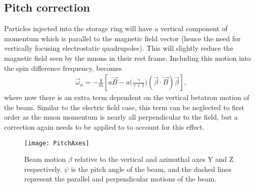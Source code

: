 


\subsection{Pitch correction}
\label{sub:pitch_correction}

Particles injected into the \gmtwo storage ring will have a vertical component of momentum which is parallel to the magnetic field vector (hence the need for vertically focusing electrostatic quadrupoles). This will slightly reduce the magnetic field seen by the muons in their rest frame. Including this motion into the spin difference frequency, \wa becomes
        \begin{align} \label{eq:wapitch}
            \vec{\omega}_{a} = -\frac{q}{m} [a\vec{B} - a \Big(\frac{\gamma}{\gamma+1}\Big)(\vec{\beta} \cdot \vec{B})\vec{\beta}],
        \end{align}
where now there is an extra term dependent on the vertical betatron motion of the beam. Similar to the electric field case, this term can be neglected to first order as the muon momentum is nearly all perpendicular to the field, but a correction again needs to be applied to \wa to account for this effect.

\begin{figure}
    \centering
    \texttt{[image: PitchAxes]}
    \caption[Pitching beam motion]{Beam motion $\beta$ relative to the vertical and azimuthal axes Y and Z respectively. $\psi$ is the pitch angle of the beam, and the dashed lines represent the parallel and perpendicular motions of the beam.}   
    \label{fig:PitchAxes}
\end{figure}

